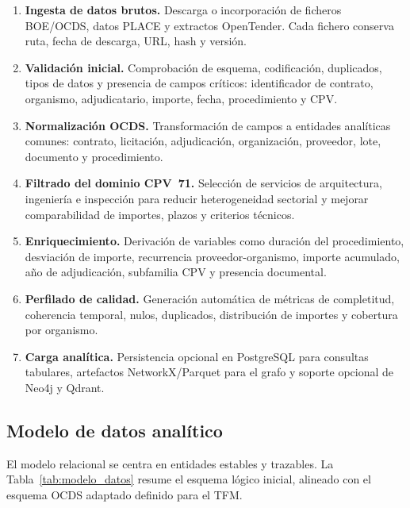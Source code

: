 \documentclass[11pt,a4paper,spanish]{book}
\numberwithin{equation}{chapter}
\numberwithin{figure}{chapter}
\begin{document}
\begin{enumerate}
  \item \textbf{Ingesta de datos brutos.} Descarga o incorporaci{\'o}n de ficheros BOE/OCDS, datos PLACE y extractos OpenTender. Cada fichero conserva ruta, fecha de descarga, URL, hash y versi{\'o}n.
  \item \textbf{Validaci{\'o}n inicial.} Comprobaci{\'o}n de esquema, codificaci{\'o}n, duplicados, tipos de datos y presencia de campos cr{\'i}ticos: identificador de contrato, organismo, adjudicatario, importe, fecha, procedimiento y CPV.
  \item \textbf{Normalizaci{\'o}n OCDS.} Transformaci{\'o}n de campos a entidades anal{\'i}ticas comunes: contrato, licitaci{\'o}n, adjudicaci{\'o}n, organizaci{\'o}n, proveedor, lote, documento y procedimiento.
  \item \textbf{Filtrado del dominio CPV~71.} Selecci{\'o}n de servicios de arquitectura, ingenier{\'i}a e inspecci{\'o}n para reducir heterogeneidad sectorial y mejorar comparabilidad de importes, plazos y criterios t{\'e}cnicos.
  \item \textbf{Enriquecimiento.} Derivaci{\'o}n de variables como duraci{\'o}n del procedimiento, desviaci{\'o}n de importe, recurrencia proveedor-organismo, importe acumulado, a{\~n}o de adjudicaci{\'o}n, subfamilia CPV y presencia documental.
  \item \textbf{Perfilado de calidad.} Generaci{\'o}n autom{\'a}tica de m{\'e}tricas de completitud, coherencia temporal, nulos, duplicados, distribuci{\'o}n de importes y cobertura por organismo.
  \item \textbf{Carga anal{\'i}tica.} Persistencia opcional en PostgreSQL para consultas tabulares, artefactos NetworkX/Parquet para el grafo y soporte opcional de Neo4j y Qdrant.
\end{enumerate}

\subsection{Modelo de datos anal{\'i}tico}

El modelo relacional se centra en entidades estables y trazables. La Tabla~\ref{tab:modelo_datos} resume el esquema l{\'o}gico inicial, alineado con el esquema OCDS adaptado definido para el TFM.
\end{document}
